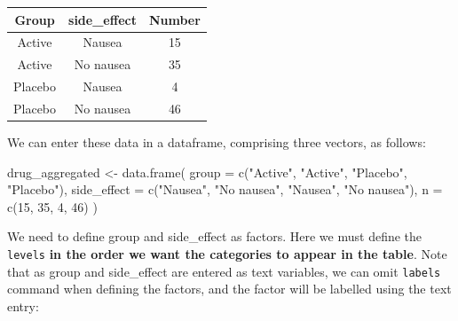\documentclass[
]{memoir}
\newenvironment{Shaded}{\begin{snugshade}}{\end{snugshade}}
\newcommand{\AttributeTok}[1]{\textcolor[rgb]{0.77,0.63,0.00}{#1}}
\newcommand{\DecValTok}[1]{\textcolor[rgb]{0.00,0.00,0.81}{#1}}
\newcommand{\FunctionTok}[1]{\textcolor[rgb]{0.00,0.00,0.00}{#1}}
\newcommand{\NormalTok}[1]{#1}
\newcommand{\OtherTok}[1]{\textcolor[rgb]{0.56,0.35,0.01}{#1}}
\newcommand{\SpecialCharTok}[1]{\textcolor[rgb]{0.00,0.00,0.00}{#1}}
\newcommand{\StringTok}[1]{\textcolor[rgb]{0.31,0.60,0.02}{#1}}
\begin{document}
\begin{longtable}[]{@{}ccc@{}}
\toprule
Group & side\_effect & Number \\
\midrule
\endhead
Active & Nausea & 15 \\
Active & No nausea & 35 \\
Placebo & Nausea & 4 \\
Placebo & No nausea & 46 \\
\bottomrule
\end{longtable}

We can enter these data in a dataframe, comprising three vectors, as follows:

\begin{Shaded}
\begin{Highlighting}[]
\NormalTok{drug\_aggregated }\OtherTok{\textless{}{-}} \FunctionTok{data.frame}\NormalTok{(}
  \AttributeTok{group =} \FunctionTok{c}\NormalTok{(}\StringTok{"Active"}\NormalTok{, }\StringTok{"Active"}\NormalTok{, }\StringTok{"Placebo"}\NormalTok{, }\StringTok{"Placebo"}\NormalTok{),}
  \AttributeTok{side\_effect =} \FunctionTok{c}\NormalTok{(}\StringTok{"Nausea"}\NormalTok{, }\StringTok{"No nausea"}\NormalTok{, }\StringTok{"Nausea"}\NormalTok{, }\StringTok{"No nausea"}\NormalTok{),}
  \AttributeTok{n =} \FunctionTok{c}\NormalTok{(}\DecValTok{15}\NormalTok{, }\DecValTok{35}\NormalTok{, }\DecValTok{4}\NormalTok{, }\DecValTok{46}\NormalTok{)}
\NormalTok{)}
\end{Highlighting}
\end{Shaded}

We need to define group and side\_effect as factors. Here we must define the \texttt{levels} \textbf{in the order we want the categories to appear in the table}. Note that as group and side\_effect are entered as text variables, we can omit \texttt{labels} command when defining the factors, and the factor will be labelled using the text entry:

\begin{Shaded}
\end{Shaded}
\end{document}
